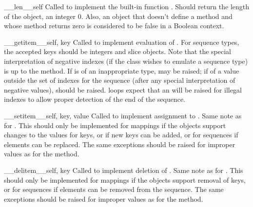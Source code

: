 \begin{methoddesc}{__len__}{self}
Called to implement the built-in function
.  Should return the length of the
object, an integer \code{>=} 0.  Also, an object that doesn't define a
 method and whose  method
returns zero is considered to be false in a Boolean context.
\end{methoddesc}

\begin{methoddesc}{__getitem__}{self, key}
Called to implement evaluation of .
For sequence types, the accepted keys should be integers and slice
objects.  Note that
the special interpretation of negative indexes (if the class wishes to
emulate a sequence type) is up to the  method.
If  is of an inappropriate type,  may be
raised; if of a value outside the set of indexes for the sequence
(after any special interpretation of negative values),
 should be raised.
   loops expect that an
 will be raised for illegal indexes to allow
proper detection of the end of the sequence.
\end{methoddesc}

\begin{methoddesc}{__setitem__}{self, key, value}
Called to implement assignment to .  Same
note as for .  This should only be implemented
for mappings if the objects support changes to the values for keys, or
if new keys can be added, or for sequences if elements can be
replaced.  The same exceptions should be raised for improper
 values as for the  method.
\end{methoddesc}

\begin{methoddesc}{__delitem__}{self, key}
Called to implement deletion of .  Same
note as for .  This should only be implemented
for mappings if the objects support removal of keys, or for sequences
if elements can be removed from the sequence.  The same exceptions
should be raised for improper  values as for the
 method.
\end{methoddesc}


